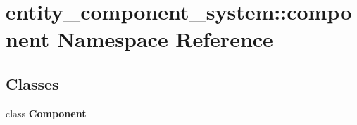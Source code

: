 \section{entity\+\_\+component\+\_\+system\+:\+:component Namespace Reference}
\label{namespaceentity__component__system_1_1component}
\subsection*{Classes}
\begin{DoxyCompactItemize}
\item 
class {\bf Component}
\end{DoxyCompactItemize}
